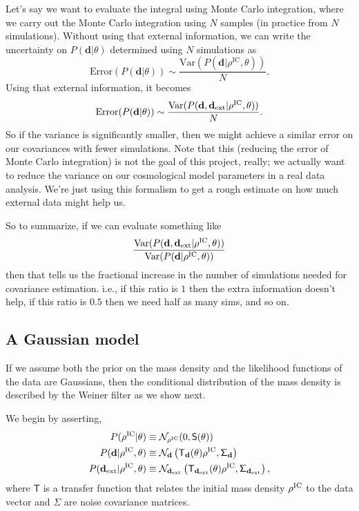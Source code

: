 \documentclass[preprint]{aastex}
\newcommand{\data}{\mathbf{d}}
\newcommand{\dataext}{\data_{\rm ext}}
\newcommand{\rhoic}{\rho^{\rm IC}}
\newcommand{\normdist}{\mathcal{N}}
\newcommand{\smat}{\mathsf{S}}
\newcommand{\noisemat}{\mathsf{\Sigma}}
\newcommand{\transfer}{\mathsf{T}}
\begin{document}
Let's say we want to evaluate the integral using Monte Carlo integration, where we carry out the
Monte Carlo integration using $N$ samples (in practice from $N$ simulations).  Without using that
external information, we can write the uncertainty on $P(\data|\theta)$ determined using $N$
simulations as
\begin{equation}
	\text{Error}(P(\data|\theta)) \sim \frac{\text{Var}(P(\data|\rho^\text{IC},\theta))}{N}.
\end{equation}
Using that external information, it becomes
\begin{equation}
	\text{Error}(P(\data|\theta)) \sim \frac{\text{Var}(P(\data,\dataext|\rho^\text{IC},\theta))}{N}.
\end{equation}
So if the variance is significantly smaller, then we might achieve a similar error on our
covariances with fewer simulations.  Note that this (reducing the error of Monte Carlo integration)
is not the goal of this project, really; we actually want to reduce the variance on our cosmological
model parameters in a real data analysis.  We're just using this formalism to get a rough estimate
on how much external data might help us.

So to summarize, if we can evaluate something like
\begin{equation}
	\frac{\text{Var}(P(\data,\dataext|\rho^\text{IC},\theta))}{\text{Var}(P(\data|\rho^\text{IC},\theta))}
\end{equation}
then that tells us the fractional increase in the number of simulations needed for covariance
estimation.  i.e., if this ratio is $1$ then the extra information doesn't help, if this ratio is
$0.5$ then we need half as many sims, and so on.

\subsection{A Gaussian model}
If we assume both the prior on the mass density and the likelihood functions of the data are 
Gaussians, then the conditional distribution of the mass density is described by the Weiner filter 
as we show next.

We begin by asserting,
\begin{align}
	P(\rhoic | \theta) &\equiv \normdist_{\rhoic}(0, \smat(\theta))
	\\
	P(\data | \rhoic, \theta) &\equiv
	\normdist_{\data}\left(\transfer_{\data}(\theta)\rhoic, \noisemat_{\data}\right)
	\\
	P(\dataext | \rhoic, \theta) &\equiv
	\normdist_{\dataext}\left(\transfer_{\dataext}(\theta)\rhoic, \noisemat_{\dataext}\right),
\end{align}
where $\transfer$ is a transfer function that relates the initial mass density $\rhoic$ 
to the data vector and $\noisemat$ are noise covariance matrices.
\end{document}

